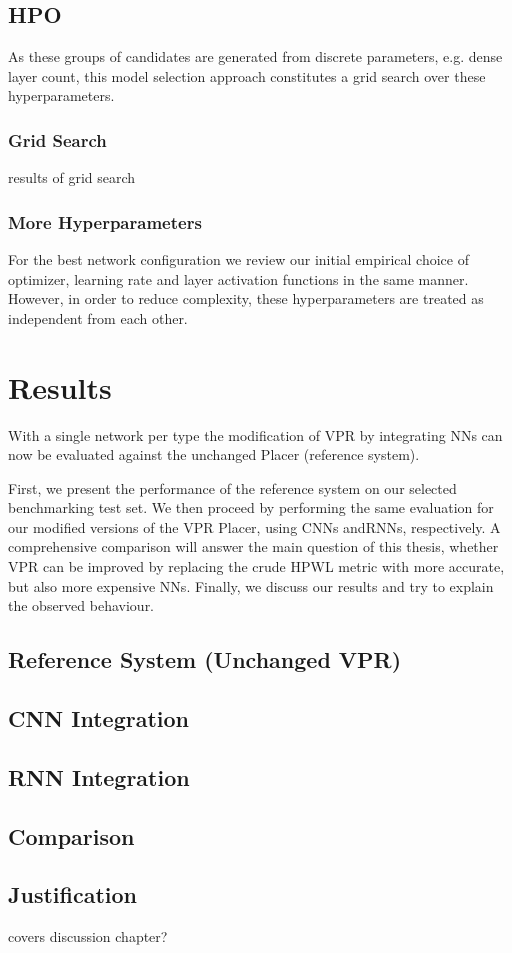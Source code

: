 \subsection{\gls{HPO}}

As these groups of candidates are generated from discrete parameters, e.g. dense layer count, this model selection approach constitutes a grid search over these hyperparameters.

\subsubsection{Grid Search}

\cite{TODO} results of grid search

\subsubsection{More Hyperparameters}

For the best network configuration we review our initial empirical choice of optimizer, learning rate and layer activation functions in the same manner. However, in order to reduce complexity, these hyperparameters are treated as independent from each other.

\cite{TODO-results}

\cite{TODO-final-configurations}

\section{Results}

With a single network per type the modification of \gls{VPR} by integrating \glspl{NN} can now be evaluated against the unchanged Placer (reference system).

First, we present the performance of the reference system on our selected benchmarking test set. We then proceed by performing the same evaluation for our modified versions of the \gls{VPR} Placer, using \glspl{CNN} and\glspl{RNN}, respectively. A comprehensive comparison will answer the main question of this thesis, whether \gls{VPR} can be improved by replacing the crude \gls{HPWL} metric with more accurate, but also more expensive \glspl{NN}. Finally, we discuss our results and try to explain the observed behaviour.

\subsection{Reference System (Unchanged \gls{VPR})}

\subsection{\gls{CNN} Integration}

\subsection{\gls{RNN} Integration}

\subsection{Comparison}

\subsection{Justification}

covers discussion chapter?
